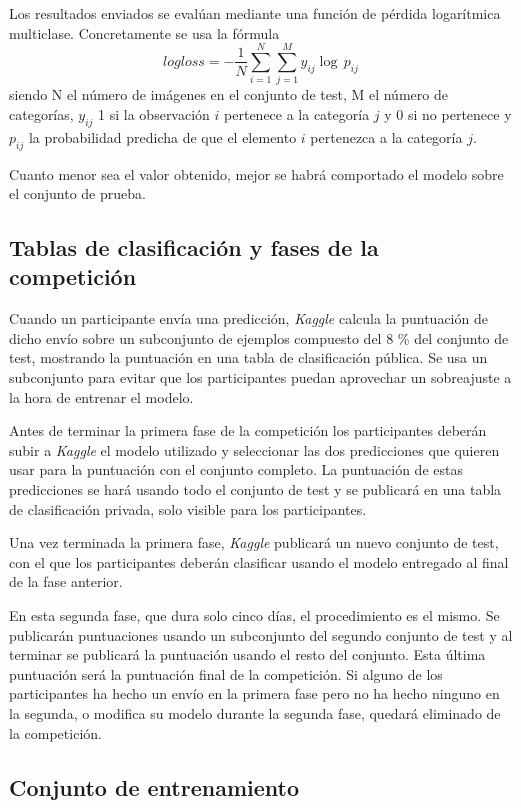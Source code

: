 Los resultados enviados se evalúan mediante una función de pérdida logarítmica multiclase. Concretamente se usa la fórmula
\[
  logloss =
  - \frac{1}{N} \sum_{i=1}^N \sum_{j=1}^M y_{ij} \log \, p_{ij}
\]
 siendo N el número de imágenes en el conjunto de test, M el número de
 categorías, $y_{ij}$ 1 si la observación $i$ pertenece a la categoría $j$ y 0 si no
 pertenece y $p_{ij}$ la probabilidad predicha de que el elemento $i$ pertenezca
 a la categoría $j$.

 Cuanto menor sea el valor obtenido, mejor se habrá comportado el modelo sobre el conjunto de prueba.

\subsection{Tablas de clasificación y fases de la competición}

Cuando un participante envía una predicción, \textit{Kaggle} calcula la
puntuación de dicho envío sobre un subconjunto de ejemplos compuesto del 8 \%
del conjunto de test, mostrando la puntuación en una tabla de clasificación
pública. Se usa un subconjunto para evitar que los participantes puedan
aprovechar un sobreajuste a la hora de entrenar el modelo.

Antes de terminar la primera fase de la competición los participantes deberán subir a \textit{Kaggle} el modelo utilizado y seleccionar las dos predicciones que quieren usar para la puntuación con el conjunto completo. La puntuación de estas predicciones se hará usando todo el conjunto de test y se publicará en una tabla de clasificación privada, solo visible para los participantes. 

Una vez terminada la primera fase, \textit{Kaggle} publicará un nuevo conjunto de test, con el que los participantes deberán clasificar usando el modelo entregado al final de la fase anterior.

En esta segunda fase, que dura solo cinco días, el procedimiento es el mismo. Se publicarán puntuaciones usando un subconjunto del segundo conjunto de test y al terminar se publicará la puntuación usando el resto del conjunto. Esta última puntuación será la puntuación final de la competición. Si alguno de los participantes ha hecho un envío en la primera fase pero no ha hecho ninguno en la segunda, o modifica su modelo durante la segunda fase, quedará eliminado de la competición.

\subsection{Conjunto de entrenamiento}
\label{dataset}

